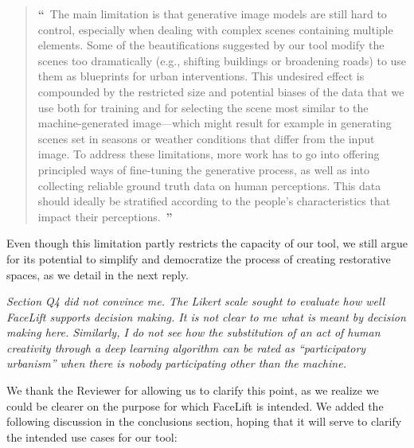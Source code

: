\documentclass{paper}
\newenvironment{myquote}
{\definecolor{shadecolor}{rgb}{0.9,0.95,1} \begin{shaded*} \sf \em}
{\em\end{shaded*}}
\begin{document}
\begin{quote}
{\bf \Large ``}~The main limitation is that generative image models are still hard to control, especially when dealing with complex scenes containing multiple elements. Some of the beautifications suggested by our tool modify the scenes too dramatically (e.g., shifting buildings or broadening roads) to use them as blueprints for urban interventions. This undesired effect is compounded by the restricted size and potential biases of the data that we use both for training and for selecting the scene most similar to the machine-generated image---which might result for example in generating scenes set in seasons or weather conditions that differ from the input image. To address these limitations, more work has to go into offering principled ways of fine-tuning the generative process, as well as into collecting reliable ground truth data on human perceptions. This data should ideally be stratified according to the people's characteristics that impact their perceptions.~{\bf \Large ''}
\end{quote}

Even though this limitation partly restricts the capacity of our tool, we still argue for its potential to simplify and democratize the process of creating restorative spaces, as we detail in the next reply.

\begin{myquote}
    Section Q4 did not convince me. The Likert scale sought to evaluate how well FaceLift supports decision making. It is not clear to me what is meant by decision making here. Similarly, I do not see how the substitution of an act of human creativity through a deep learning algorithm can be rated as ``participatory urbanism'' when there is nobody participating other than the machine.
\end{myquote}

We thank the Reviewer for allowing us to clarify this point, as we realize we could be clearer on the purpose for which FaceLift is intended. We added the following discussion in the conclusions section, hoping that it will serve to clarify the intended use cases for our tool:
\end{document}
